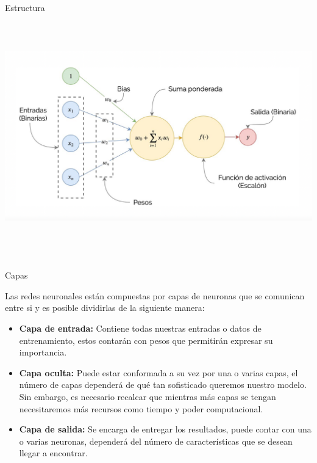 \documentclass[
  ignorenonframetext,
]{beamer}
\begin{document}
\begin{frame}
\begin{block}{Estructura}
\includegraphics[width=\textwidth,height=4.16667in]{1.png}

\end{block}

\begin{block}{Capas}

Las redes neuronales están compuestas por capas de neuronas que se
comunican entre si y es posible dividirlas de la siguiente manera:

\begin{itemize}
\item
  \textbf{Capa de entrada:} Contiene todas nuestras entradas o datos de
  entrenamiento, estos contarán con pesos que permitirán expresar su
  importancia.
\item
  \textbf{Capa oculta:} Puede estar conformada a su vez por una o varias
  capas, el número de capas dependerá de qué tan sofisticado queremos
  nuestro modelo. Sin embargo, es necesario recalcar que mientras más
  capas se tengan necesitaremos más recursos como tiempo y poder
  computacional.
\item
  \textbf{Capa de salida:} Se encarga de entregar los resultados, puede
  contar con una o varias neuronas, dependerá del número de
  características que se desean llegar a encontrar.
\end{itemize}


\end{block}
\end{frame}
\end{document}
